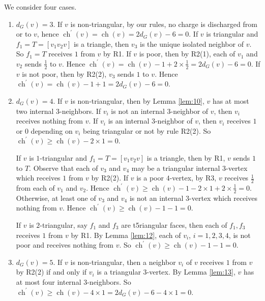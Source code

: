 \documentclass{article}
\begin{document}
We consider four cases.
\begin{enumerate}[label=(\arabic*)]
\item $d_G(v)=3$. 
If $v$ is non-triangular, by our rules, no charge is discharged from or to $v$, hence $\operatorname{ch}^{\prime}(v)=\operatorname{ch}(v)=2d_G(v)-6 = 0$. If $v$ is triangular and $f_1=T=[v_1v_2v]$ is a triangle, then $v_3$ is the unique isolated neighbor of $v$.  So $f_1=T$ receives $1$ from $v$ by R1. If $v$ is poor, then by R2(1), each of $v_1$ and $v_2$ sends $\frac{1}{2}$ to $v$. Hence $\operatorname{ch}^{\prime}(v)=\operatorname{ch}(v)-1 + 2\times\frac{1}{2}=2d_G(v)-6 = 0$.  If $v$ is not poor, then by R2(2), $v_3$ sends $1$ to $v$. Hence $\operatorname{ch}^{\prime}(v)=\operatorname{ch}(v)-1 + 1=2d_G(v)-6 = 0$.
\item $d_G(v)=4$. 
If $v$ is non-triangular, then by Lemma \ref{lem:10}, $v$ has at most two internal $3$-neighbors. 
If $v_i$ is not an internal $3$-neighbor of $v$, then $v_i$ receives nothing from $v$. If $v_i$ is an internal $3$-neighbor of $v$, then $v_i$ receives $1$ or $0$ depending on $v_i$ being triangular or not by rule R2(2). So $\operatorname{ch}^{\prime}(v)\ge \operatorname{ch}(v)-2\times1 = 0$.

If $v$ is $1$-triangular and $f_1=T=[v_1v_2v]$ is a triangle, then by R1, $v$ sends $1$ to $T$. 
Observe that each of $v_3$ and $v_4$ may be a triangular internal $3$-vertex which receives $1$ from $v$ by R2(2). If $v$ is a poor $4$-vertex, by R3, $v$ receives $\frac{1}{2}$ from each of $v_1$ and $v_2$. Hence $\operatorname{ch}^{\prime}(v)\ge \operatorname{ch}(v)-1-2\times1 + 2\times\frac{1}{2}=0$. Otherwise,  at least one of $v_3$ and $v_4$ is not an internal $3$-vertex which receives nothing from $v$. Hence $\operatorname{ch}^{\prime}(v)\ge \operatorname{ch}(v)-1 - 1=0$.

If $v$ is $2$-triangular, say $f_1$ and $f_3$ are t5riangular faces, then  each of $f_1,f_3$ receives $1$ from $v$ by R1. 
By Lemma \ref{lem:12}, each of $v_i$, $i = 1,2,3,4$, is not poor and receives nothing from $v$. So $\operatorname{ch}^{\prime}(v)\ge \operatorname{ch}(v)-1 - 1=0$.

\item $d_G(v)=5$. 
If $v$ is non-triangular, then a neighbor $v_i$ of $v$ receives   $1$ from $v$ by R2(2) if and only if $v_i$ is a triangular $3$-vertex. By Lemma \ref{lem:13}, $v$ has at most four internal $3$-neighbors. 
So $\operatorname{ch}^{\prime}(v)\ge \operatorname{ch}(v)-4\times1=2d_G(v)-6-4\times1 = 0$. 


\end{enumerate}
\end{document}
